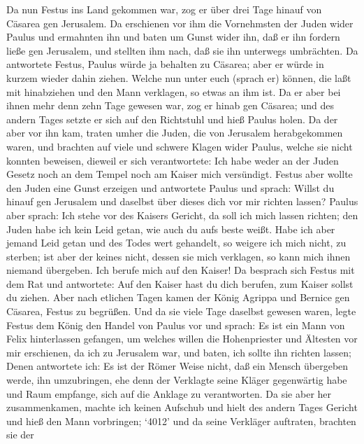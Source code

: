  Da nun Festus ins Land gekommen war, zog er über drei Tage
hinauf von Cäsarea gen Jerusalem.  Da erschienen vor ihm die
Vornehmsten der Juden wider Paulus und ermahnten ihn  und
baten um Gunst wider ihn, daß er ihn fordern ließe gen Jerusalem, und
stellten ihm nach, daß sie ihn unterwegs umbrächten.  Da
antwortete Festus, Paulus würde ja behalten zu Cäsarea; aber er würde in
kurzem wieder dahin ziehen.  Welche nun unter euch (sprach
er) können, die laßt mit hinabziehen und den Mann verklagen, so etwas an
ihm ist.  Da er aber bei ihnen mehr denn zehn Tage gewesen
war, zog er hinab gen Cäsarea; und des andern Tages setzte er sich auf
den Richtstuhl und hieß Paulus holen.  Da der aber vor ihn
kam, traten umher die Juden, die von Jerusalem herabgekommen waren, und
brachten auf viele und schwere Klagen wider Paulus, welche sie nicht
konnten beweisen,  dieweil er sich verantwortete: Ich habe
weder an der Juden Gesetz noch an dem Tempel noch am Kaiser mich
versündigt.  Festus aber wollte den Juden eine Gunst
erzeigen und antwortete Paulus und sprach: Willst du hinauf gen
Jerusalem und daselbst über dieses dich vor mir richten lassen?
 Paulus aber sprach: Ich stehe vor des Kaisers Gericht, da
soll ich mich lassen richten; den Juden habe ich kein Leid getan, wie
auch du aufs beste weißt.  Habe ich aber jemand Leid getan
und des Todes wert gehandelt, so weigere ich mich nicht, zu sterben; ist
aber der keines nicht, dessen sie mich verklagen, so kann mich ihnen
niemand übergeben. Ich berufe mich auf den Kaiser!  Da
besprach sich Festus mit dem Rat und antwortete: Auf den Kaiser hast du
dich berufen, zum Kaiser sollst du ziehen.  Aber nach
etlichen Tagen kamen der König Agrippa und Bernice gen Cäsarea, Festus
zu begrüßen.  Und da sie viele Tage daselbst gewesen waren,
legte Festus dem König den Handel von Paulus vor und sprach: Es ist ein
Mann von Felix hinterlassen gefangen,  um welches willen
die Hohenpriester und Ältesten vor mir erschienen, da ich zu Jerusalem
war, und baten, ich sollte ihn richten lassen;  Denen
antwortete ich: Es ist der Römer Weise nicht, daß ein Mensch übergeben
werde, ihn umzubringen, ehe denn der Verklagte seine Kläger gegenwärtig
habe und Raum empfange, sich auf die Anklage zu verantworten.
 Da sie aber her zusammenkamen, machte ich keinen Aufschub
und hielt des andern Tages Gericht und hieß den Mann vorbringen;
 `4012' und da seine Verkläger auftraten, brachten sie der
